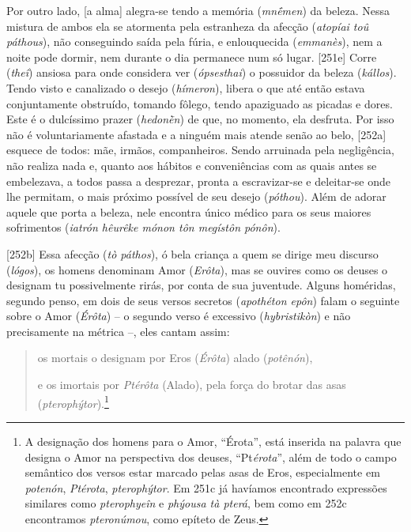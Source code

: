 Por outro lado, {[}a alma{]} alegra-se tendo a memória (\emph{mnḗmen})
da beleza. Nessa mistura de ambos ela se atormenta pela estranheza da
afecção (\emph{atopíai toû páthous}), não conseguindo saída pela fúria,
e enlouquecida (\emph{emmanès}), nem a noite pode dormir, nem durante o
dia permanece num só lugar. {[}251e{]} Corre (\emph{theî}) ansiosa para
onde considera ver (\emph{ópsesthai}) o possuidor da beleza
(\emph{kállos}). Tendo visto e canalizado o desejo (\emph{hímeron}),
libera o que até então estava conjuntamente obstruído, tomando fôlego,
tendo apaziguado as picadas e dores. Este é o dulcíssimo prazer
(\emph{hedonḕn}) de que, no momento, ela desfruta. Por isso não é
voluntariamente afastada e a ninguém mais atende senão ao belo,
{[}252a{]} esquece de todos: mãe, irmãos, companheiros. Sendo arruinada
pela negligência, não realiza nada e, quanto aos hábitos e conveniências
com as quais antes se embelezava, a todos passa a desprezar, pronta a
escravizar-se e deleitar-se onde lhe permitam, o mais próximo possível
de seu desejo (\emph{póthou}). Além de adorar aquele que porta a beleza,
nele encontra único médico para os seus maiores sofrimentos
(\emph{iatrón hêurêke mónon tôn megístôn pónôn}).

{[}252b{]} Essa afecção (\emph{tò páthos}), ó bela criança a quem se
dirige meu discurso (\emph{lógos}), os homens denominam Amor
(\emph{Erôta}), mas se ouvires como os deuses o designam tu
possivelmente rirás, por conta de sua juventude. Alguns homéridas,
segundo penso, em dois de seus versos secretos (\emph{apothéton epôn})
falam o seguinte sobre o Amor (\emph{Érôta}) -- o segundo verso é
excessivo (\emph{hybristikòn}) e não precisamente na métrica --, eles
cantam assim:

\begin{quote}
os mortais o designam por Eros (\emph{Érôta}) alado (\emph{potênón}),

e os imortais por \emph{Ptérôta} (Alado), pela força do brotar das asas
(\emph{pterophýtor}).\footnote{A designação dos homens para o Amor,
  ``Érota'', está inserida na palavra que designa o Amor na perspectiva
  dos deuses, ``Pt\emph{\emph{érota}}'', além de todo o campo semântico
  dos versos estar marcado pelas asas de Eros, especialmente em
  \emph{potenón}, \emph{Ptérota}, \emph{pterophýtor}. Em 251c já
  havíamos encontrado expressões similares como \emph{pterophyeîn} e
  \emph{phýousa tà pterá}, bem como em 252c encontramos
  \emph{pteronúmou}, como epíteto de Zeus.}
\end{quote}

